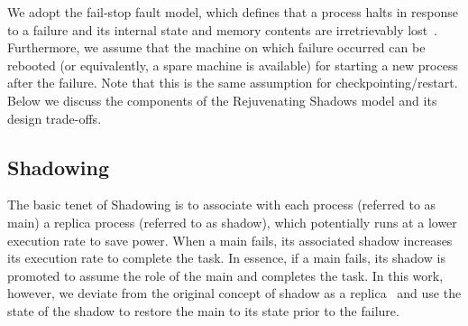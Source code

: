 

We adopt the fail-stop fault model, which defines that a process halts in response to a failure and its internal state and memory contents are irretrievably 
lost~\cite{Schlichting1983}. Furthermore, we assume that the machine on which failure occurred can be rebooted (or equivalently, a spare machine is available) for starting a new process after the failure. Note that this is the same assumption for checkpointing/restart. Below we discuss the components of the Rejuvenating Shadows model and its design trade-offs.
 

\subsection{Shadowing}
\label{sec:shadow}
The basic tenet of Shadowing is to associate with each process (referred to as main) a replica process (referred to as shadow), which potentially runs at a lower execution rate to save power. When a main fails, its associated shadow increases its execution rate to complete the task. In essence, if a main fails, its shadow is promoted to assume the role of the main and completes the task. 
In this work, however, we deviate from the original concept of shadow as a replica~\cite{cui_2016_scalcom} and use the state of the shadow to restore the main to its state prior to the failure. 


